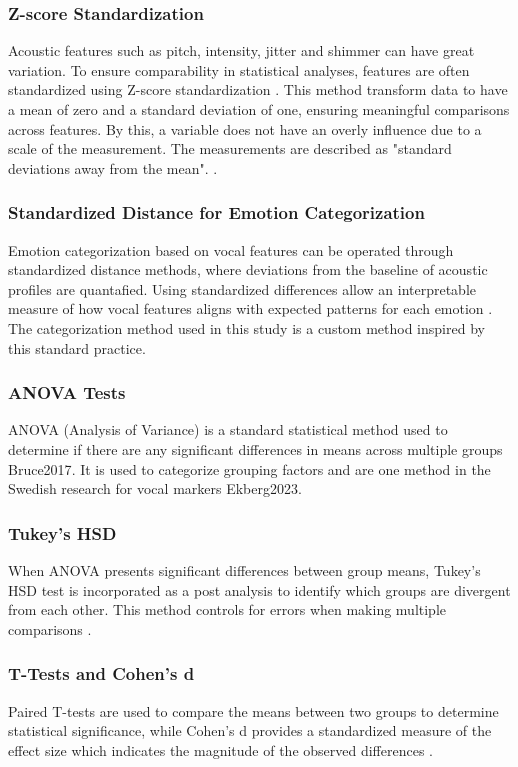 \subsubsection{Z-score Standardization}
Acoustic features such as pitch, intensity, jitter and shimmer can have great variation. To ensure comparability in statistical analyses, features are often standardized using Z-score standardization \autocite{Ekberg2023}.
This method transform data to have a mean of zero and a standard deviation of one, ensuring meaningful comparisons across features. By this, a variable does not have an overly influence due to a scale of the measurement. 
The measurements are described as "standard deviations away from the mean". \autocite{Bruce2017}. 

\subsubsection{Standardized Distance for Emotion Categorization}
Emotion categorization based on vocal features can be operated through standardized distance methods, where deviations from the baseline of acoustic profiles are quantafied. Using standardized differences allow an interpretable measure of how vocal features aligns with expected patterns for each emotion \autocite{Ekberg2023} \autocite{Bruce2017}. 
The categorization method used in this study is a custom method inspired by this standard practice. 

\subsubsection{ANOVA Tests}
ANOVA (Analysis of Variance) is a standard statistical method used to determine if there are any significant differences in means across multiple groups {Bruce2017}. It is used to categorize grouping factors and are one method in the Swedish research for vocal markers {Ekberg2023}.  

\subsubsection{Tukey's HSD}
When ANOVA presents significant differences between group means, Tukey's HSD test is incorporated as a post analysis to identify which groups are divergent from each other. 
This method controls for errors when making multiple comparisons \autocite{Bruce2017}. 
\subsubsection{T-Tests and Cohen's d}
Paired T-tests are used to compare the means between two groups to determine statistical significance, while Cohen's d provides a standardized measure of the effect size which indicates the magnitude of the observed differences \autocite{Cohen1977} \autocite{Bruce2017}.